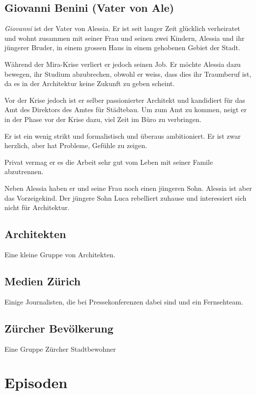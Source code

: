 \documentclass[11pt,a4paper,ngerman]{scrreprt}
\begin{document}
\section*{Giovanni Benini (Vater von Ale)}

\emph{Giovanni} ist der Vater von Alessia. Er ist seit langer Zeit glücklich
verheiratet und wohnt zusammen mit seiner Frau und seinen zwei Kindern, Alessia
und ihr jüngerer Bruder, in einem grossen Haus in einem gehobenen Gebiet der
Stadt.

Während der Mira-Krise verliert er jedoch seinen Job. Er möchte Alessia dazu
bewegen, ihr Studium abzubrechen, obwohl er weiss, dass dies ihr Traumberuf ist,
da es in der Architektur keine Zukunft zu geben scheint.

Vor der Krise jedoch ist er selber passionierter Architekt und kandidiert für
das Amt des Direktors des Amtes für Städtebau. Um zum Amt zu kommen, neigt er in
der Phase vor der Krise dazu, viel Zeit im Büro zu verbringen.

Er ist ein wenig strikt und formalistisch und überaus ambitioniert.  Er ist zwar
herzlich, aber hat Probleme, Gefühle zu zeigen.

Privat vermag er es die Arbeit sehr gut vom Leben mit seiner Famile abzutrennen.

Neben Alessia haben er und seine Frau noch einen jüngeren Sohn. Alessia ist aber
das Vorzeigekind. Der jüngere Sohn Luca rebelliert zuhause und interessiert sich
nicht für Architektur.

\section*{Architekten}

Eine kleine Gruppe von Architekten.

\section*{Medien Zürich}

Einige Journalisten, die bei Pressekonferenzen dabei sind und ein Fernsehteam.

\section*{Zürcher Bevölkerung}

Eine Gruppe Zürcher Stadtbewohner

\chapter*{Episoden}
\end{document}
